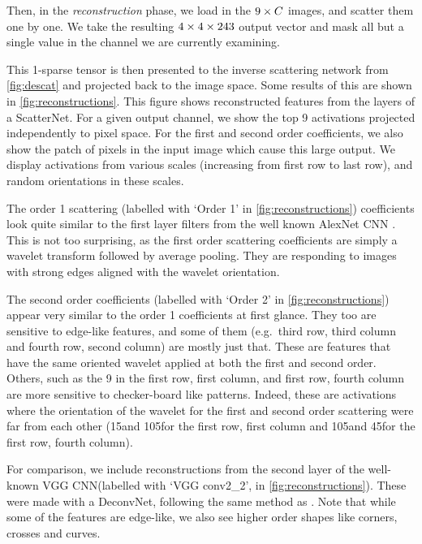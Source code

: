 Then, in the \emph{reconstruction}
phase, we load in the $9\times C$ images, and scatter them one by one. We take the
resulting $4\times 4\times 243$ output vector and mask all but a single value in the channel we are currently examining.

This 1-sparse tensor is then presented to the inverse scattering network from
\autoref{fig:descat} and projected back to the image space. Some results of this
are shown in \autoref{fig:reconstructions}. This figure shows reconstructed
features from the layers of a ScatterNet. For a given output channel, we show
the top 9 activations projected independently to pixel space. For the first and
second order coefficients, we also show the patch of pixels in the input image
which cause this large output. We display activations from various scales
(increasing from first row to last row), and random orientations in these
scales. 

The order 1 scattering (labelled with `Order 1' in
\autoref{fig:reconstructions}) coefficients look quite similar to the first
layer filters from the well known AlexNet CNN \cite{krizhevsky_imagenet_2012}.
This is not too surprising, as the first order scattering coefficients are
simply a wavelet transform followed by average pooling. They are responding to
images with strong edges aligned with the wavelet orientation. 

The second order coefficients (labelled with `Order
2' in \autoref{fig:reconstructions}) appear very similar to the order
1 coefficients at first glance.
They too are sensitive to edge-like features, and some of them (e.g.\ third row,
third column and fourth row, second column) are mostly just that. These are
features that have the same oriented wavelet applied at both the first and
second order.  Others, such as the 9 in the first row, first column, and first
row, fourth column are more sensitive to checker-board like patterns. Indeed,
these are activations where the orientation of the wavelet for the first and
second order scattering were far from each other (15\degs and 105\degs for the
first row, first column and 105\degs and 45\degs for the first row, fourth
column).

For comparison, we include reconstructions from the second layer of the
well-known VGG CNN\@ (labelled with `VGG conv2\_2', in
\autoref{fig:reconstructions}). These were made with a DeconvNet, following the
same method as \cite{zeiler_visualizing_2014}. Note that while some of
the features are edge-like, we also see higher order shapes like corners,
crosses and curves.

